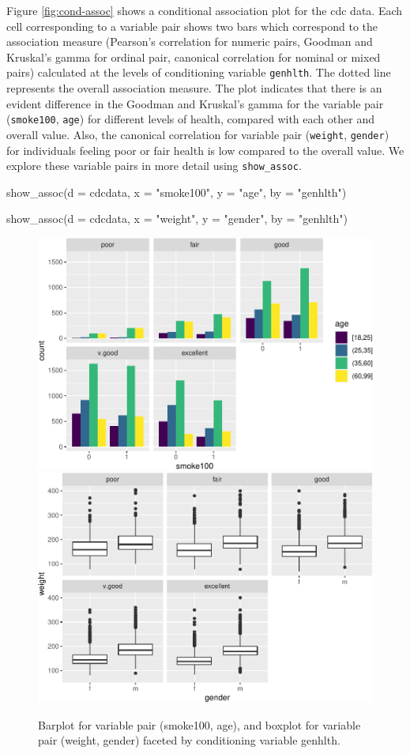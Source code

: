 Figure \ref{fig:cond-assoc} shows a conditional association plot for the
cdc data. Each cell corresponding to a variable pair shows two bars
which correspond to the association measure (Pearson's correlation for
numeric pairs, Goodman and Kruskal's gamma for ordinal pair, canonical
correlation for nominal or mixed pairs) calculated at the levels of
conditioning variable \texttt{genhlth}. The dotted line represents the
overall association measure. The plot indicates that there is an evident
difference in the Goodman and Kruskal's gamma for the variable pair
(\texttt{smoke100}, \texttt{age}) for different levels of health,
compared with each other and overall value. Also, the canonical
correlation for variable pair (\texttt{weight}, \texttt{gender}) for
individuals feeling poor or fair health is low compared to the overall
value. We explore these variable pairs in more detail using
\texttt{show\_assoc}.

\begin{Schunk}
\begin{Sinput}
show_assoc(d = cdcdata,
           x = "smoke100",
           y = "age",
           by = "genhlth")

show_assoc(d = cdcdata,
           x = "weight",
           y = "gender",
           by = "genhlth")
\end{Sinput}
\begin{figure}
\includegraphics[width=0.5\linewidth]{rj_paper_files/figure-latex/int-pairs-conditional-cdc-1} \includegraphics[width=0.5\linewidth]{rj_paper_files/figure-latex/int-pairs-conditional-cdc-2} \caption[Barplot for variable pair (smoke100, age), and boxplot for variable pair (weight, gender) faceted by conditioning variable genhlth]{Barplot for variable pair (smoke100, age), and boxplot for variable pair (weight, gender) faceted by conditioning variable genhlth.}\label{fig:int-pairs-conditional-cdc}
\end{figure}
\end{Schunk}

